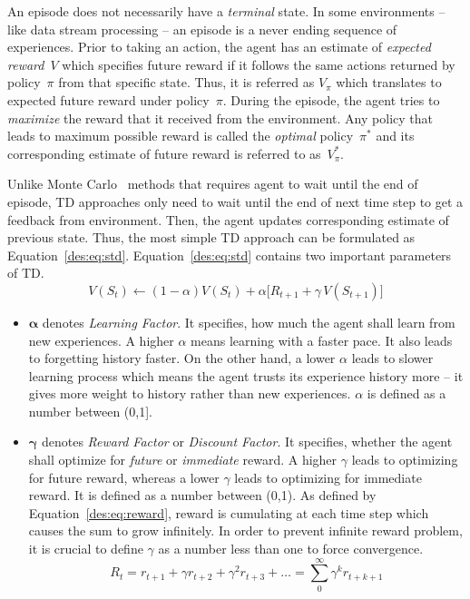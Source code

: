 An episode does not necessarily have a \emph{terminal} state. In some environments -- like data stream processing -- an episode is a never ending sequence of experiences. Prior to taking an action, the agent has an estimate of \emph{expected reward}~$V$ which specifies future reward if it follows the same actions returned by policy~$\pi$ from that specific state. Thus, it is referred as $V_\pi$ which translates to expected future reward under policy~$\pi$. During the episode, the agent tries to \emph{maximize} the reward that it received from the environment. Any policy that leads to maximum possible reward is called the \emph{optimal} policy~$\pi^*$ and its corresponding estimate of future reward is referred to as~$V^{*}_{\pi}$.

Unlike Monte Carlo~\cite{rlIntro} methods that requires agent to wait until the end of episode, TD approaches only need to wait until the end of next time step to get a feedback from environment. Then, the agent updates corresponding estimate of previous state. Thus, the most simple TD approach can be formulated as Equation~\ref{des:eq:std}. Equation~\ref{des:eq:std} contains two important parameters of TD.
\begin{equation}
V(S_t) \longleftarrow (1-\alpha)V(S_t) + \alpha\big[R_{t+1} + \gamma\,V(S_{t+1})\big]
\label{des:eq:std}
\end{equation}
\begin{itemize}
	\item $\bm{\alpha}$ denotes \emph{Learning Factor}. It specifies, how much the agent shall learn from new experiences. A higher $\alpha$ means learning with a faster pace. It also leads to forgetting history faster. On the other hand, a lower $\alpha$ leads to slower learning process which means the agent trusts its experience history more -- it gives more weight to history rather than new experiences. $\alpha$ is defined as a number between (0,1].
	\item $\bm{\gamma}$ denotes \emph{Reward Factor} or \emph{Discount Factor}. It specifies, whether the agent shall optimize for \emph{future} or \emph{immediate} reward. A higher $\gamma$ leads to optimizing for future reward, whereas a lower $\gamma$ leads to optimizing for immediate reward. It is defined as a number between (0,1). As defined by Equation~\ref{des:eq:reward}, reward is cumulating at each time step which causes the sum to grow infinitely. In order to prevent infinite reward problem, it is crucial to define $\gamma$ as a number less than one to force convergence.
	\begin{equation}
	R_t = r_{t+1}+\gamma r_{t+2}+\gamma^2 r_{t+3}+\dots=\sum_{0}^{\infty}\gamma^k r_{t+k+1}
	\label{des:eq:reward}
	\end{equation}
\end{itemize}


